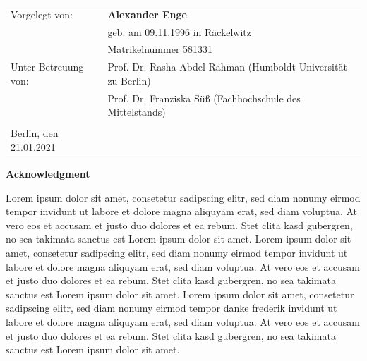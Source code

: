 \documentclass[
  english,
  doc,12pt,twoside,floatsintext]{apa7}
\begin{document}
\begin{flushleft}
{
\begin{tabular}{ll}
Vorgelegt von:&\textbf{Alexander Enge}\\
&geb. am 09.11.1996 in Räckelwitz\\
&Matrikelnummer 581331\\
Unter Betreuung von:&Prof. Dr. Rasha Abdel Rahman (Humboldt-Universität zu Berlin)\\
&Prof. Dr. Franziska Süß (Fachhochschule des Mittelstands)\\
&\\
Berlin, den 21.01.2021&\\
\end{tabular}
}
\end{flushleft}

\clearpage

\mbox{}\thispagestyle{empty}\clearpage

\thispagestyle{empty}

\begin{center}\textbf{Acknowledgment}\end{center}

Lorem ipsum dolor sit amet, consetetur sadipscing elitr, sed diam nonumy eirmod tempor invidunt ut labore et dolore magna aliquyam erat, sed diam voluptua. At vero eos et accusam et justo duo dolores et ea rebum. Stet clita kasd gubergren, no sea takimata sanctus est Lorem ipsum dolor sit amet. Lorem ipsum dolor sit amet, consetetur sadipscing elitr, sed diam nonumy eirmod tempor invidunt ut labore et dolore magna aliquyam erat, sed diam voluptua. At vero eos et accusam et justo duo dolores et ea rebum. Stet clita kasd gubergren, no sea takimata sanctus est Lorem ipsum dolor sit amet. Lorem ipsum dolor sit amet, consetetur sadipscing elitr, sed diam nonumy eirmod tempor danke frederik invidunt ut labore et dolore magna aliquyam erat, sed diam voluptua. At vero eos et accusam et justo duo dolores et ea rebum. Stet clita kasd gubergren, no sea takimata sanctus est Lorem ipsum dolor sit amet.

\clearpage

\mbox{}\thispagestyle{empty}\clearpage

\thispagestyle{empty}
\begin{flushleft}
{
\tableofcontents
}
\end{flushleft}

\clearpage

\mbox{}\thispagestyle{empty}\clearpage
\end{document}
